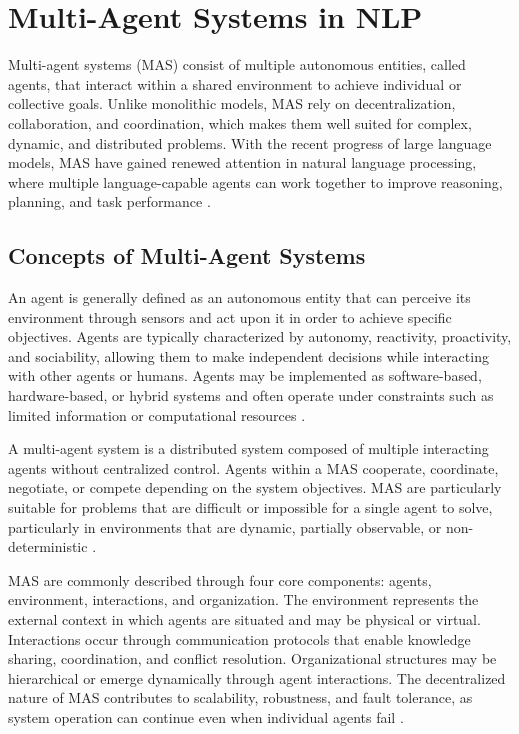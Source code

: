 \section{Multi-Agent Systems in NLP}

Multi-agent systems (MAS) consist of multiple autonomous entities, called agents, that interact within a shared environment to achieve individual or collective goals. Unlike monolithic models, MAS rely on decentralization, collaboration, and coordination, which makes them well suited for complex, dynamic, and distributed problems. With the recent progress of large language models, MAS have gained renewed attention in natural language processing, where multiple language-capable agents can work together to improve reasoning, planning, and task performance \cite{tran2025multiagentcollaborationmechanismssurvey}.

\subsection{Concepts of Multi-Agent Systems}

An agent is generally defined as an autonomous entity that can perceive its environment through sensors and act upon it in order to achieve specific objectives. Agents are typically characterized by autonomy, reactivity, proactivity, and sociability, allowing them to make independent decisions while interacting with other agents or humans. Agents may be implemented as software-based, hardware-based, or hybrid systems and often operate under constraints such as limited information or computational resources \cite{8352646}.

A multi-agent system is a distributed system composed of multiple interacting agents without centralized control. Agents within a MAS cooperate, coordinate, negotiate, or compete depending on the system objectives. MAS are particularly suitable for problems that are difficult or impossible for a single agent to solve, particularly in environments that are dynamic, partially observable, or non-deterministic \cite{argoneto-2008}.

MAS are commonly described through four core components: agents, environment, interactions, and organization. The environment represents the external context in which agents are situated and may be physical or virtual. Interactions occur through communication protocols that enable knowledge sharing, coordination, and conflict resolution. Organizational structures may be hierarchical or emerge dynamically through agent interactions. The decentralized nature of MAS contributes to scalability, robustness, and fault tolerance, as system operation can continue even when individual agents fail \cite{8352646}.

